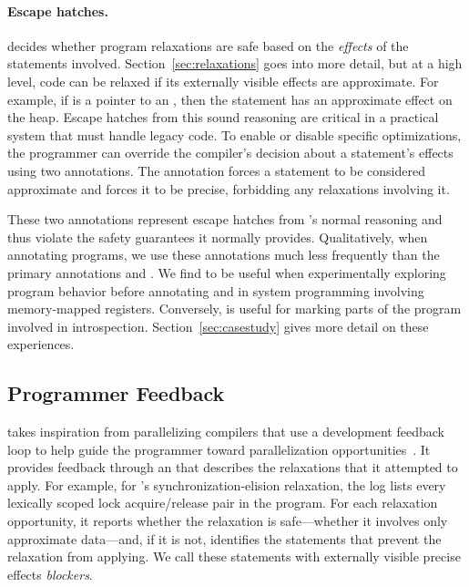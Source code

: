 \paragraph{Escape hatches.}
\sysname decides whether program relaxations are safe based on the
\emph{effects} of the statements involved. Section~\ref{sec:relaxations} goes
into more detail, but at a high level, code can be relaxed if its externally
visible effects are approximate.  For example, if  is a pointer to
an , then the statement  has an approximate effect
on the heap.
Escape hatches from this sound reasoning are critical in a practical
system that must handle legacy code.
To enable or disable specific optimizations, the programmer can
override the compiler's decision about a statement's effects using two
annotations. The \annpermit annotation forces a statement to
be considered approximate
and \annforbid forces it to be precise, forbidding
any relaxations involving it.

These two annotations represent escape hatches from \sysname's normal
reasoning and thus violate the safety guarantees it normally provides.
%
Qualitatively, when annotating programs, we use these
annotations much less frequently than the primary annotations
 and . We find \annpermit to be
useful when experimentally exploring program behavior before annotating and in
system programming involving memory-mapped registers.  Conversely,
\annforbid is useful for marking parts of the program involved in
introspection. Section~\ref{sec:casestudy} gives more detail on these
experiences.

\subsection{Programmer Feedback}
\label{sec:feedback}

\sysname takes inspiration from parallelizing compilers that use a development
feedback loop to help guide the programmer toward parallelization
opportunities~\cite{canal, deditor}.
It provides
feedback through an  that describes the relaxations that it
attempted to apply. For example, for \sysname's synchronization-elision
relaxation, the log lists every lexically scoped lock acquire/release pair in
the program. For each relaxation opportunity, it reports whether the relaxation
is safe---whether it involves only approximate data---and, if it is
not, identifies the statements that prevent the relaxation from applying.
We call these statements with
externally visible precise effects \emph{blockers}.

